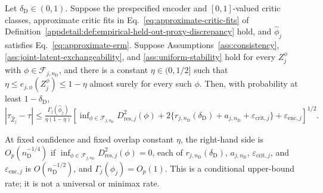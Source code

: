 \begin{theorem}
\label{appdetail:cor:representation-causal}
\normalfont

Let $\delta_{\mathrm D}\in(0,1)$. Suppose the prespecified encoder and $[0,1]$-valued critic classes, approximate critic fits in Eq.~\eqref{eq:approximate-critic-fits} of Definition~\ref{appdetail:def:empirical-held-out-proxy-discrepancy} hold, and $\widehat\phi_j$ satisfies Eq.~\eqref{eq:approximate-erm}. Suppose Assumptions~\ref{ass:consistency}, \ref{ass:joint-latent-exchangeability}, and \ref{ass:uniform-stability} hold for every $Z_j^\phi$ with $\phi\in\mathcal F_{j,n_{\mathrm D}}$, and there is a constant $\eta\in(0,1/2]$ such that $\eta\le e_{j,\phi}(Z_j^\phi)\le1-\eta$ almost surely for every such $\phi$. Then, with probability at least $1-\delta_{\mathrm D}$,
\(|\tau_{\widehat Z_j}-\tau| \le \frac{\Gamma_j(\widehat\phi_j)}{\eta(1-\eta)} \left[ \inf_{\phi\in\mathcal F_{j,n_{\mathrm D}}}D_{\mathrm{res},j}^2(\phi) +2\{r_{j,n_{\mathrm D}}(\delta_{\mathrm D})+a_{j,n_{\mathrm D}}+\varepsilon_{\mathrm{crit},j}\} +\varepsilon_{\mathrm{enc},j} \right]^{1/2}.\)
\end{theorem}
At fixed confidence and fixed overlap constant $\eta$, the right-hand side is $O_p(n_{\mathrm D}^{-1/4})$ if $\inf_{\phi\in\mathcal F_{j,n_{\mathrm D}}}D_{\mathrm{res},j}^2(\phi)=0$, each of $r_{j,n_{\mathrm D}}(\delta_{\mathrm D})$, $a_{j,n_{\mathrm D}}$, $\varepsilon_{\mathrm{crit},j}$, and $\varepsilon_{\mathrm{enc},j}$ is $O(n_{\mathrm D}^{-1/2})$, and $\Gamma_j(\widehat\phi_j)=O_p(1)$. This is a conditional upper-bound rate; it is not a universal or minimax rate.

